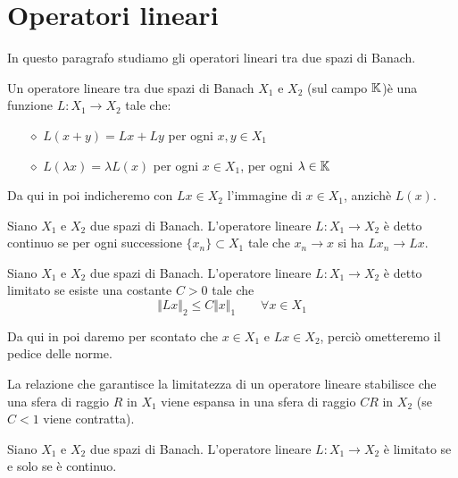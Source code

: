 \section{Operatori lineari}

In questo paragrafo studiamo gli operatori lineari tra due spazi di Banach.

\begin{defn}
Un operatore lineare tra due spazi di Banach $X_1$ e $X_2$ (sul campo $\mathbb{K}$)è una funzione $L:X_1\to X_2$ tale che:
\begin{enumerate}
    \item [$\diamond$] $L(x+y)=Lx+Ly$ per ogni $x,y\in X_1$
    \item [$\diamond$] $L(\lambda x)=\lambda L(x)$ per ogni $x\in X_1$, per ogni $\lambda\in\mathbb{K}$
\end{enumerate}
\end{defn}

Da qui in poi indicheremo con $Lx\in X_2$ l'immagine di $x\in X_1$, anzichè $L(x)$. 

\begin{defn}
Siano $X_1$ e $X_2$ due spazi di Banach. L'operatore lineare $L:X_1\to X_2$ è detto continuo se per ogni successione $\{x_n \}\subset X_1$ tale che $x_n\to x$ si ha $Lx_n\to Lx$.
\end{defn}

\begin{defn}
Siano $X_1$ e $X_2$ due spazi di Banach. L'operatore lineare $L:X_1\to X_2$ è detto limitato se esiste una costante $C>0$ tale che
\begin{equation*}
\Vert Lx\Vert_2\leq C\Vert x \Vert_1 \qquad \forall x \in X_1
\end{equation*}
\end{defn}

Da qui in poi daremo per scontato che $x\in X_1$ e $Lx\in X_2$, perciò ometteremo il pedice delle norme.

\begin{rem}
La relazione che garantisce la limitatezza di un operatore lineare stabilisce che una sfera di raggio $R$ in $X_1$ viene espansa in una sfera di raggio $CR$ in $X_2$ (se $C<1$ viene contratta).
\end{rem}

\begin{thm}
Siano $X_1$ e $X_2$ due spazi di Banach. L'operatore lineare $L:X_1\to X_2$ è limitato se e solo se è continuo.
\end{thm}

